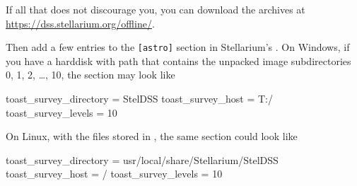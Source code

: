 If all that does not discourage you, you can download the archives at
\url{https://dss.stellarium.org/offline/}.

Then add a few entries to the \texttt{[astro]} section in
Stellarium's .  On Windows, if you have a harddisk
 with path  that contains the
unpacked image subdirectories 0, 1, 2, \ldots, 10, the section may look like
\begin{configfile}
[astro]
toast_survey_directory = StelDSS
toast_survey_host = T:/
toast_survey_levels = 10
\end{configfile}
On Linux, with the files stored in , the same section could look like
\begin{configfile}
[astro]
toast_survey_directory = usr/local/share/Stellarium/StelDSS
toast_survey_host = /
toast_survey_levels = 10
\end{configfile}





